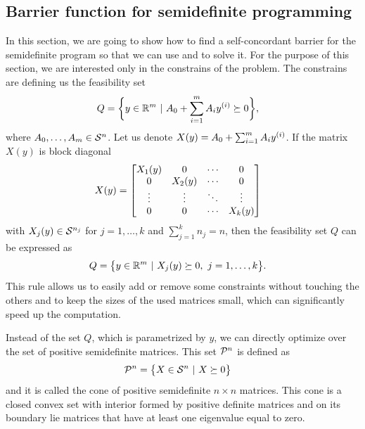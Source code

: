 \subsection{Barrier function for semidefinite programming}
In this section, we are going to show how to find a self-concordant barrier for the semidefinite program  so that we can use  and  to solve it.
For the purpose of this section, we are interested only in the constrains of the problem.
The constrains are defining us the feasibility set
\begin{align}
  Q &= \bigg\{y\in\mathbb{R}^m\ |\ A_0 + \sum_{i=1}^mA_iy^{(i)} \succeq 0\bigg\},
\end{align}
where $A_0, \ldots, A_m \in\mathcal{S}^n$.
Let us denote $X(y) = A_0 + \sum_{i=1}^mA_iy^{(i)}$.
If the matrix $X(y)$ is block diagonal
\begin{align}
  X(y) &= \begin{bmatrix}
          X_1(y) & 0      & \cdots & 0      \\
          0      & X_2(y) & \cdots & 0      \\
          \vdots & \vdots & \ddots & \vdots \\
          0      & 0      & \cdots & X_k(y)
        \end{bmatrix} \labeleq{SDP:bf:bd}
\end{align}
with $X_j(y)\in\mathcal{S}^{n_j}$ for $j = 1, \ldots, k$ and $\sum_{j=1}^k n_j = n$, then the feasibility set $Q$ can be expressed as
\begin{align}
  Q &= \big\{y\in\mathbb{R}^m\ |\ X_j(y) \succeq 0,\ j = 1,\ldots, k\big\}.
\end{align}
This rule allows us to easily add or remove some constraints without touching the others and to keep the sizes of the used matrices small, which can significantly speed up the computation.

Instead of the set $Q$, which is parametrized by $y$, we can directly optimize over the set of positive semidefinite matrices.
This set $\mathcal{P}^n$ is defined as
\begin{align}
  \mathcal{P}^n &= \big\{X\in\mathcal{S}^n\ |\ X\succeq0\big\}
\end{align}
and it is called the cone of positive semidefinite $n\times n$ matrices.
This cone is a closed convex set with interior formed by positive definite matrices and on its boundary lie matrices that have at least one eigenvalue equal to zero.

